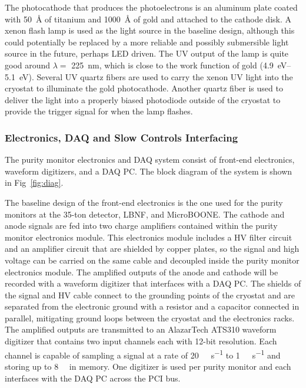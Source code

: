 The photocathode that produces the photoelectrons is an aluminum plate coated with \SI{50}{\angstrom} of titanium and \SI{1000}{\angstrom} of gold and attached to the cathode disk. A xenon flash lamp is used as the light source in the baseline design, although this could potentially be replaced by a more reliable and possibly submersible light source in the future, perhaps LED driven. The UV output of the lamp is quite good around $\lambda=$ \SI{225}{\nano\meter}, which is close to the work function of gold (\SIrange{4.9}{5.1}{\eV}). Several UV quartz fibers are used to carry the xenon UV light into the cryostat to illuminate the gold photocathode.   Another quartz fiber is used to deliver the light into a properly biased photodiode outside of the cryostat to provide the trigger signal for when the lamp flashes. 

\subsubsection{Electronics, DAQ and Slow Controls Interfacing}
The purity monitor electronics and DAQ system consist of front-end electronics, waveform digitizers, and a DAQ PC.  The block diagram of the system is shown in Fig~\ref{fig:diag}. 

The baseline design of the front-end electronics is the one used for the purity monitors at the 35-ton detector, LBNF, and MicroBOONE. The cathode and anode signals are fed into two charge amplifiers contained within the purity monitor electronics module. This electronics module includes a HV filter circuit and an amplifier circuit that are shielded by copper plates, so the signal and high voltage can be carried on the same cable and decoupled inside the purity monitor electronics module. The amplified outputs of the anode and cathode will be recorded with a waveform digitizer that interfaces with a DAQ PC. The shields of the signal and HV cable connect to the grounding points of the cryostat and are separated from the electronic ground with a resistor and a capacitor connected in parallel, mitigating ground loops between the cryostat and the electronics racks. The amplified outputs are transmitted to an AlazarTech ATS310 waveform digitizer that contains two input channels each with 12-bit resolution. Each channel is capable of sampling a signal at a rate of \SI{20}{\mega\samples\per\second} to \SI{1}{\kilo\samples\per\second} and storing up to \SI{8}{\mega\samples} in memory. One digitizer is used per purity monitor and each interfaces with the DAQ PC across the PCI bus. 

